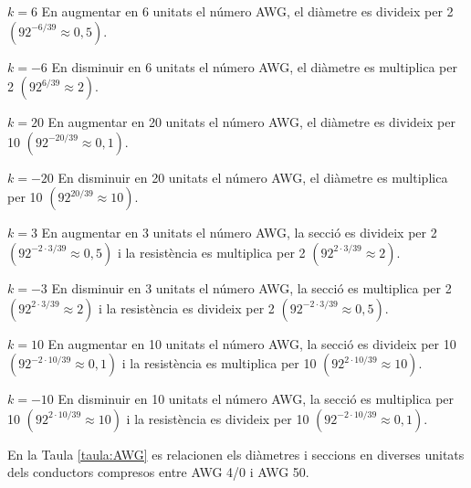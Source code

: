 \begin{list}{}
   {\setlength{\labelwidth}{15mm} \setlength{\leftmargin}{17mm} \setlength{\labelsep}{2mm}}

   \item[$k=6$\hfill] En augmentar en 6  unitats el n\'{u}mero AWG, el di\`{a}metre es divideix per 2
                 $(92^{-6/39}\approx 0{,}5)$.

   \item[$k=-6$\hfill] En disminuir en 6 unitats el n\'{u}mero AWG, el di\`{a}metre es multiplica per 2
                 $(92^{6/39}\approx 2)$.

   \item[$k=20$\hfill] En augmentar en 20  unitats el n\'{u}mero AWG, el di\`{a}metre es divideix per 10
                 $(92^{-20/39}\approx 0{,}1)$.

   \item[$k=-20$\hfill] En disminuir en 20 unitats el n\'{u}mero AWG, el di\`{a}metre es multiplica per 10
                 $(92^{20/39}\approx 10)$.

   \item[$k=3$\hfill] En augmentar en 3 unitats el n\'{u}mero AWG, la secci\'{o} es divideix per 2
                 $(92^{-2\cdot3/39}\approx 0{,}5)$ i la resist\`{e}ncia es multiplica per 2
                 $(92^{2\cdot3/39}\approx 2)$.

   \item[$k=-3$\hfill] En disminuir en 3 unitats el n\'{u}mero AWG, la secci\'{o} es multiplica per 2
                  $(92^{2\cdot3/39}\approx 2)$ i la resist\`{e}ncia es divideix per 2
                  $(92^{-2\cdot3/39}\approx 0{,}5)$.

   \item[$k=10$\hfill] En augmentar en 10 unitats el n\'{u}mero AWG, la secci\'{o} es divideix per 10
                 $(92^{-2\cdot10/39}\approx 0{,}1)$ i la resist\`{e}ncia es multiplica per 10
                 $(92^{2\cdot10/39}\approx 10)$.

   \item[$k=-10$\hfill] En disminuir en 10 unitats el n\'{u}mero AWG, la secci\'{o} es multiplica per 10
                  $(92^{2\cdot10/39}\approx 10)$ i la resist\`{e}ncia es divideix per 10
                  $(92^{-2\cdot10/39}\approx 0{,}1)$.
\end{list}

En la Taula \vref{taula:AWG} es relacionen els di\`{a}metres i seccions en diverses unitats dels conductors compresos entre AWG 4/0 i AWG 50.

